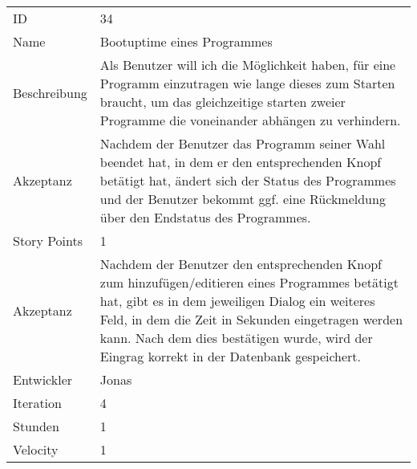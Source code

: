 \begin{table}[htbp]
\begin{minipage}{\linewidth}
\setlength{\tymax}{0.5\linewidth}
\centering
\small
\begin{tabulary}{\textwidth}{|l|p{10cm}|} \toprule
 ID   &34\\


Name  &Bootuptime eines Programmes\\
Beschreibung&Als Benutzer will ich die Möglichkeit haben, für eine Programm einzutragen wie lange dieses zum Starten braucht, um das gleichzeitige starten zweier Programme die voneinander abhängen zu verhindern.\\
Akzeptanz &Nachdem der Benutzer das Programm seiner Wahl beendet hat, in dem er den entsprechenden Knopf betätigt hat, ändert sich der Status des Programmes und der Benutzer bekommt ggf. eine Rückmeldung über den Endstatus des Programmes.\\
Story Points&1\\
Akzeptanz &Nachdem der Benutzer den entsprechenden Knopf zum hinzufügen\slash editieren eines Programmes betätigt hat, gibt es in dem jeweiligen Dialog ein weiteres Feld, in dem die Zeit in Sekunden eingetragen werden kann. Nach dem dies bestätigen wurde, wird der Eingrag korrekt in der Datenbank gespeichert.\\
Entwickler &Jonas\\
Iteration &4\\
Stunden  &1\\
Velocity &1\\
\bottomrule

\end{tabulary}
\end{minipage}
\end{table}



